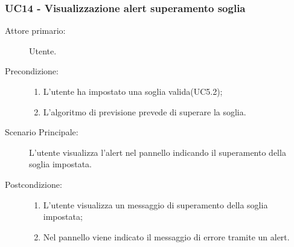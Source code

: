 \subsubsection{UC14 - Visualizzazione alert superamento soglia}
\label{sssec:uc14}
\begin{description}
	\item[Attore primario:] Utente.
	\item[Precondizione:]
	\begin{enumerate}
		\item L'utente ha impostato una soglia valida(UC5.2);
		\item L'algoritmo di previsione prevede di superare la soglia.
	\end{enumerate}
	\item[Scenario Principale:] L'utente visualizza l'alert nel pannello indicando il superamento della soglia impostata.
	\item[Postcondizione:]
	\begin{enumerate}
		\item L'utente visualizza un messaggio di superamento della soglia impostata;
		\item Nel pannello viene indicato il messaggio di errore tramite un alert.
	\end{enumerate}
\end{description}